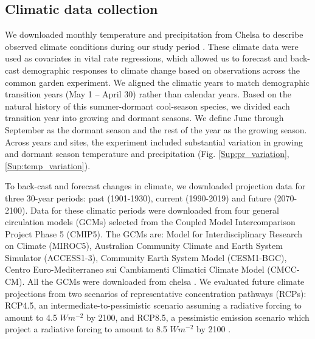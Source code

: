 \documentclass[12pt]{article}
\begin{document}
\subsection*{Climatic data collection}
We downloaded monthly temperature and precipitation from Chelsa to describe observed climate conditions during our study period \citep{karger2017climatologies}.
These climate data were used as covariates in vital rate regressions, which allowed us to forecast and back-cast demographic responses to climate change based on observations across the common garden experiment. 
We aligned the climatic years to match demographic transition years {\color{blue}(May 1 -- April 30)} rather than calendar years.
Based on the natural history of this summer-dormant cool-season species, we divided each transition year into growing and dormant seasons. 
We define June through September as the dormant season and the rest of the year as the growing season. 
Across years and sites, the experiment included substantial variation in growing and dormant season temperature and precipitation (Fig. \ref{Sup:pr_variation}, \ref{Sup:temp_variation}).

To back-cast and forecast changes in climate, we downloaded projection data for three 30-year periods: past (1901-1930), current (1990-2019) and future (2070-2100).
Data for these climatic periods were downloaded from four general circulation models (GCMs) selected from the Coupled Model Intercomparison Project Phase 5 (CMIP5). 
The GCMs are: Model for Interdisciplinary Research on Climate (MIROC5), Australian Community Climate and Earth System Simulator (ACCESS1-3), Community Earth System Model (CESM1-BGC), Centro Euro-Mediterraneo sui Cambiamenti Climatici Climate Model (CMCC-CM).
All the GCMs were downloaded from chelsa \citep{sanderson2015representative}.
We evaluated future climate projections from two scenarios of representative concentration pathways (RCPs): RCP4.5, an intermediate-to-pessimistic scenario assuming a radiative forcing to amount to 4.5 $W m^{-2}$ by 2100, and RCP8.5, a pessimistic emission scenario which project a radiative forcing to amount to 8.5 $W m^{-2}$ by 2100 \citep{thomson2011rcp4, schwalm2020rcp8}.
\end{document}
